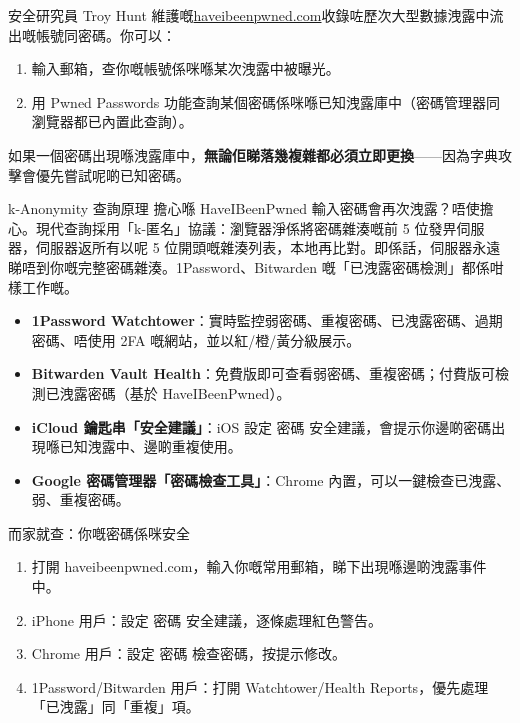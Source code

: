 安全研究員 Troy Hunt 維護嘅\href{https://haveibeenpwned.com}{haveibeenpwned.com}收錄咗歷次大型數據洩露中流出嘅帳號同密碼。你可以：

\begin{enumerate}
  \item 輸入郵箱，查你嘅帳號係咪喺某次洩露中被曝光。
  \item 用 Pwned Passwords 功能查詢某個密碼係咪喺已知洩露庫中（密碼管理器同瀏覽器都已內置此查詢）。
\end{enumerate}

如果一個密碼出現喺洩露庫中，\textbf{無論佢睇落幾複雜都必須立即更換}——因為字典攻擊會優先嘗試呢啲已知密碼。

\begin{tcbinfo}{k-Anonymity 查詢原理}
擔心喺 HaveIBeenPwned 輸入密碼會再次洩露？唔使擔心。現代查詢採用「k-匿名」協議：瀏覽器淨係將密碼雜湊嘅前 5 位發畀伺服器，伺服器返所有以呢 5 位開頭嘅雜湊列表，本地再比對。即係話，伺服器永遠睇唔到你嘅完整密碼雜湊。1Password、Bitwarden 嘅「已洩露密碼檢測」都係咁樣工作嘅。

\end{tcbinfo}


\begin{itemize}
  \item \textbf{1Password Watchtower}：實時監控弱密碼、重複密碼、已洩露密碼、過期密碼、唔使用 2FA 嘅網站，並以紅/橙/黃分級展示。
  \item \textbf{Bitwarden Vault Health}：免費版即可查看弱密碼、重複密碼；付費版可檢測已洩露密碼（基於 HaveIBeenPwned）。
  \item \textbf{iCloud 鑰匙串「安全建議」}：iOS 設定 密碼 安全建議，會提示你邊啲密碼出現喺已知洩露中、邊啲重複使用。
  \item \textbf{Google 密碼管理器「密碼檢查工具」}：Chrome 內置，可以一鍵檢查已洩露、弱、重複密碼。
\end{itemize}

\begin{tcbpractice}{而家就查：你嘅密碼係咪安全}
\begin{enumerate}
  \item 打開 haveibeenpwned.com，輸入你嘅常用郵箱，睇下出現喺邊啲洩露事件中。
  \item iPhone 用戶：設定 密碼 安全建議，逐條處理紅色警告。
  \item Chrome 用戶：設定 密碼 檢查密碼，按提示修改。
  \item 1Password/Bitwarden 用戶：打開 Watchtower/Health Reports，優先處理「已洩露」同「重複」項。
\end{enumerate}

\end{tcbpractice}

